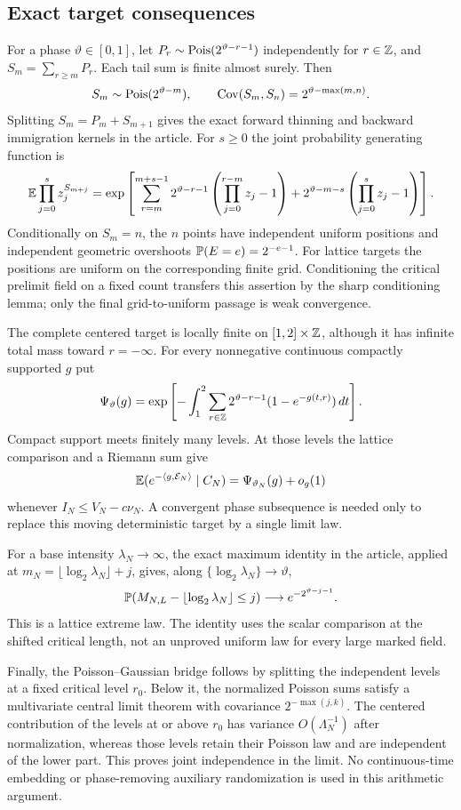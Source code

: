 \subsection{Exact target consequences}\label{supp:sec:target-consequences}
For a phase $\vartheta\in[0,1]$, let
$P_r\sim\operatorname{Pois}(2^{\vartheta-r-1})$ independently for $r\in\mathbb Z$, and
$S_m=\sum_{r\ge m}P_r$. Each tail sum is finite almost surely. Then
\[
 S_m\sim\operatorname{Pois}(2^{\vartheta-m}),\qquad
 \operatorname{Cov}(S_m,S_n)=2^{\vartheta-\max(m,n)}.
\]
Splitting $S_m=P_m+S_{m+1}$ gives the exact forward thinning and
backward immigration kernels in the article. For $s\ge0$ the joint
probability generating function is
\[
 \mathbb E\prod_{j=0}^s z_j^{S_{m+j}}
 =\exp\left[
 \sum_{r=m}^{m+s-1}2^{\vartheta-r-1}
       \left(\prod_{j=0}^{r-m}z_j-1\right)
 +2^{\vartheta-m-s}\left(\prod_{j=0}^sz_j-1\right)\right].
\]
Conditionally on $S_m=n$, the $n$ points have independent uniform
positions and independent geometric overshoots
$\mathbb P(E=e)=2^{-e-1}$. For lattice targets the positions are uniform on
the corresponding finite grid. Conditioning the critical prelimit field
on a fixed count transfers this assertion by the sharp conditioning
lemma; only the final grid-to-uniform passage is weak convergence.

The complete centered target is locally finite on $[1,2]\times\mathbb Z$,
although it has infinite total mass toward $r=-\infty$. For every
nonnegative continuous compactly supported $g$ put
\[
 \Psi_\vartheta(g)=
 \exp\left[-\int_1^2\sum_{r\in\mathbb Z}2^{\vartheta-r-1}
                                (1-e^{-g(t,r)})\,dt\right].
\]
Compact support meets finitely many levels. At those levels the lattice
comparison and a Riemann sum give
\[
 \mathbb E(e^{-\langle g,\mathcal E_N\rangle}\mid C_N)
                         =\Psi_{\vartheta_N}(g)+o_g(1)
\]
whenever $I_N\le V_N-c\nu_N$. A convergent phase subsequence is needed
only to replace this moving deterministic target by a single limit law.

For a base intensity $\lambda_N\to\infty$, the exact maximum identity
in the article, applied at
$m_N=\lfloor\log_2\lambda_N\rfloor+j$, gives, along
$\{\log_2\lambda_N\}\to\vartheta$,
\[
 \mathbb P(M_{N,L}-\lfloor\log_2\lambda_N\rfloor\le j)
                         \longrightarrow e^{-2^{\vartheta-j-1}}.
\]
This is a lattice extreme law. The identity uses the scalar comparison
at the shifted critical length, not an unproved uniform law for every
large marked field.

Finally, the Poisson--Gaussian bridge follows by splitting the independent
levels at a fixed critical level $r_0$. Below it, the normalized Poisson
sums satisfy a multivariate central limit theorem with covariance
$2^{-\max(j,k)}$. The centered contribution of the levels at or above
$r_0$ has variance $O(\Lambda_N^{-1})$ after normalization, whereas
those levels retain their Poisson law and are independent of the lower
part. This proves joint independence in the limit. No continuous-time
embedding or phase-removing auxiliary randomization is used in this
arithmetic argument.

